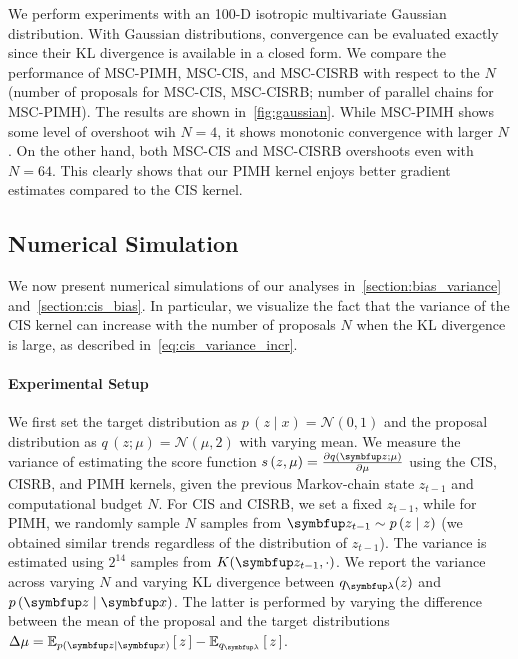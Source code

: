 %
We perform experiments with an 100-D isotropic multivariate Gaussian distribution.
With Gaussian distributions, convergence can be evaluated exactly since their KL divergence is available in a closed form.
We compare the performance of MSC-PIMH, MSC-CIS, and MSC-CISRB with respect to the \(N\) (number of proposals for MSC-CIS, MSC-CISRB; number of parallel chains for MSC-PIMH).
The results are shown in~\cref{fig:gaussian}.
While MSC-PIMH shows some level of overshoot wih \(N=4\), it shows monotonic convergence with larger \(N\).
On the other hand, both MSC-CIS and MSC-CISRB overshoots even with \(N=64\).
This clearly shows that our PIMH kernel enjoys better gradient estimates compared to the CIS kernel.

\subsection{Numerical Simulation}
We now present numerical simulations of our analyses in~\cref{section:bias_variance} and~\cref{section:cis_bias}.
In particular, we visualize the fact that the variance of the CIS kernel can increase with the number of proposals \(N\) when the KL divergence is large, as described in~\eqref{eq:cis_variance_incr}.

\paragraph{Experimental Setup}
We first set the target distribution as \(p\,(z \mid x) = \mathcal{N}(0, 1)\) and the proposal distribution as \(q\,(z; \mu) = \mathcal{N}(\mu, 2)\) with varying mean.
We measure the variance of estimating the score function \(s\,(z, \mu) = \frac{\partial q(\vz; \mu)}{\partial \mu} \) using the CIS, CISRB, and PIMH kernels, given the previous Markov-chain state \(z_{t-1}\) and computational budget \(N\).
For CIS and CISRB, we set a fixed \(z_{t-1}\), while for PIMH, we randomly sample \(N\) samples from \(\vz_{t-1} \sim p\,(z \mid z)\) (we obtained similar trends regardless of the distribution of \(z_{t-1}\)).
The variance is estimated using \(2^{14}\) samples from \(K(\vz_{t-1}, \cdot)\).
We report the variance across varying \(N\) and varying KL divergence between \(q_{\vlambda}(z)\) and \(p\,(\vz\mid\vx)\).
The latter is performed by varying the difference between the mean of the proposal and the target distributions \(\Delta \mu = \Esub{p(\vz\mid\vx)}{z} - \Esub{q_{\vlambda}}{z} \).

